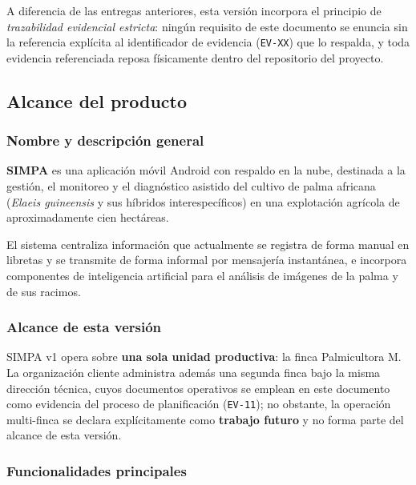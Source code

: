\documentclass[11pt,a4paper]{article}
\newcommand{\id}[1]{\texttt{\begingroup\hyphenpenalty=10000\relax#1\endgroup}}
\renewcommand{\id}[1]{\texttt{#1}}
\begin{document}
A diferencia de las entregas anteriores, esta versión incorpora el principio de \emph{trazabilidad
evidencial estricta}: ningún requisito de este documento se enuncia sin la referencia explícita al
identificador de evidencia (\id{EV-XX}) que lo respalda, y toda evidencia referenciada reposa
físicamente dentro del repositorio del proyecto.

\subsection{Alcance del producto}

\subsubsection{Nombre y descripción general}

\textbf{SIMPA} es una aplicación móvil Android con respaldo en la nube, destinada a la gestión,
el monitoreo y el diagnóstico asistido del cultivo de palma africana (\emph{Elaeis guineensis} y
sus híbridos interespecíficos) en una explotación agrícola de aproximadamente cien hectáreas.

El sistema centraliza información que actualmente se registra de forma manual en libretas y se
transmite de forma informal por mensajería instantánea, e incorpora componentes de inteligencia
artificial para el análisis de imágenes de la palma y de sus racimos.

\subsubsection{Alcance de esta versión}

SIMPA v1 opera sobre \textbf{una sola unidad productiva}: la finca Palmicultora M. La organización
cliente administra además una segunda finca bajo la misma dirección técnica, cuyos documentos
operativos se emplean en este documento como evidencia del proceso de planificación
(\id{EV-11}); no obstante, la operación multi-finca se declara explícitamente como
\textbf{trabajo futuro} y no forma parte del alcance de esta versión.

\subsubsection{Funcionalidades principales}
\end{document}

